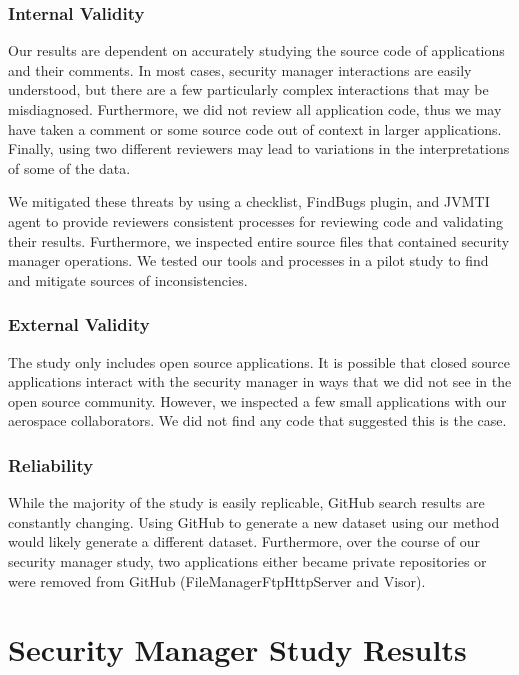 \documentclass{sig-alternate}
\begin{document}
\subsubsection{Internal Validity}

Our results are dependent on accurately studying the source code of
applications and their comments. In most cases, security manager interactions
are easily understood, but there are a few particularly complex interactions
that may be misdiagnosed. Furthermore, we did not review all application
code, thus we may have taken a comment or some source code out of
context in larger applications. Finally, using two different reviewers
may lead to variations in the interpretations of some of the data. 

We mitigated these threats by using a checklist, FindBugs plugin, and JVMTI agent to
provide reviewers consistent processes for reviewing code
and validating their results. Furthermore,
we inspected entire source files that contained
security manager operations. We tested our tools and processes in a pilot study
to find and mitigate sources of inconsistencies.

\subsubsection{External Validity}

The study only includes open source applications. It is possible
that closed source applications interact with the security manager
in ways that we did not see in the open source community. However,
we inspected a few small applications with our aerospace collaborators.
We did not find any code that suggested this is the case. 

\subsubsection{Reliability}

While the majority of the study is easily replicable, GitHub search results are constantly
changing. Using GitHub to generate a new dataset using our method
would likely generate a different dataset. Furthermore, over the course of our security
manager study, two applications either became private repositories
or were removed from GitHub (FileManagerFtpHttpServer and Visor).

\section{Security Manager Study Results}\label{sec:Study-results}
\end{document}
